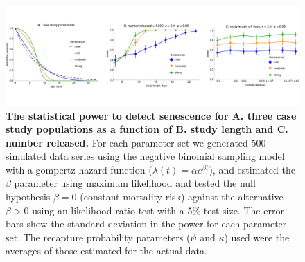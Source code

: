 \documentclass[12pt]{article}
\begin{document}
{\begin{figure}[ht]
	\centerline{\includegraphics[width=1.25\textwidth]{./Figure_files/mrr_mcPowerAnalysis_senescence.pdf}}
	\caption{\textbf{The statistical power to detect senescence for A. three case study populations as a function of B. study length and C. number released.} For each parameter set we generated 500 simulated data series using the negative binomial sampling model with a gompertz hazard function ($\lambda(t) = \alpha e^{\beta t}$), and estimated the $\beta$ parameter using maximum likelihood and tested the null hypothesis $\beta=0$ (constant mortality risk) against the alternative $\beta>0$ using an likelihood ratio test with a 5\% test size. The error bars show the standard deviation in the power for each parameter set. The recapture probability parameters ($\psi$ and $\kappa$) used were the averages of those estimated for the actual data.}
	\label{fig:mrr_mcPowerAnalysis_senescence}
\end{figure}

}
\end{document}
